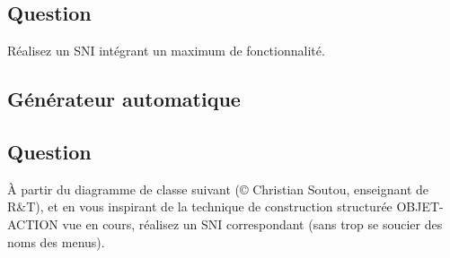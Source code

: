 \documentclass[12pt]{article}
\def\dc{\textsf{diagramme de classe}}
\def\sni{\textsf{SNI}}
\begin{document}
\subsection*{Question}

Réalisez un \sni{} intégrant un maximum de fonctionnalité.

\begin{center}
\fbox{
  \begin{minipage}{6in}
    \hfill\vspace{6in}
  \end{minipage}
}
\end{center}

\subsection{Générateur automatique}

\subsection*{Question}

\`A partir du \dc{} suivant (\copyright{} Christian Soutou, enseignant de R\&T), et en vous inspirant de la technique de
 construction structurée OBJET-ACTION vue en cours, réalisez un
 \sni{} correspondant (sans trop se soucier des noms des menus).

\begin{center}
\end{center}
\end{document}
